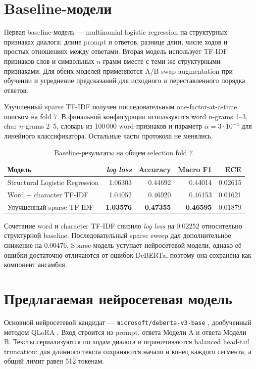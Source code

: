 \documentclass[a4paper,11pt]{article}
\newcommand{\metric}{\textit{log loss}}
\newcommand{\code}[1]{\texttt{#1}}
\begin{document}
\section{Baseline-модели}

Первая baseline-модель --- multinomial logistic regression на структурных
признаках диалога: длине prompt и ответов, разнице длин, числе ходов и простых
отношениях между ответами. Вторая модель использует TF-IDF признаков слов и
символьных $n$-грамм вместе с теми же структурными признаками. Для обеих
моделей применяются A/B swap augmentation при обучении и усреднение
предсказаний для исходного и переставленного порядка ответов.

Улучшенный sparse TF-IDF получен последовательным one-factor-at-a-time
поиском на fold 7. В финальной конфигурации используются word $n$-grams
1--3, char $n$-grams 2--5, словарь из 100\,000 word-признаков и параметр
$\alpha=3\cdot10^{-4}$ для линейного классификатора. Остальные части
протокола не менялись.

\begin{table}[htbp]
\centering
\caption{Baseline-результаты на общем selection fold 7.}
\label{tab:baselines}
\small
\begin{tabularx}{\textwidth}{|Y|R|R|R|R|}
\hline
{} Модель & \metric & Accuracy & Macro F1 & ECE \\ \hline
Structural Logistic Regression & 1.06303 & 0.44692 & 0.44014 & 0.02615 \\ \hline
Word + character TF-IDF & 1.04052 & 0.46920 & 0.46153 & 0.01621 \\ \hline
Улучшенный sparse TF-IDF & \textbf{1.03576} & \textbf{0.47355} & \textbf{0.46595} & 0.01879 \\ \hline
\end{tabularx}
\end{table}

Сочетание word и character TF-IDF снизило \metric{} на $0.02252$ относительно
структурной baseline. Последовательный sparse sweep дал дополнительное
снижение на $0.00476$. Sparse-модель уступает нейросетевой модели, однако её
ошибки достаточно отличаются от ошибок DeBERTa, поэтому она сохранена как
компонент ансамбля.

\section{Предлагаемая нейросетевая модель}

Основной нейросетевой кандидат --- \code{microsoft/deberta-v3-base}
\cite{deberta}, дообученный методом QLoRA \cite{qlora}. Вход строится из
prompt, ответа Модели A и ответа Модели B. Тексты сериализуются по ходам
диалога и ограничиваются balanced head-tail truncation: для длинного текста
сохраняются начало и конец каждого сегмента, а общий лимит равен 512 токенам.
\end{document}
